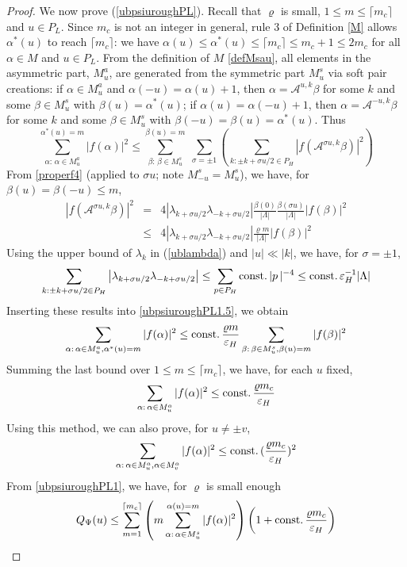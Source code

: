 \documentclass[11pt]{article}
\numberwithin{equation}{section}
\newcommand{\beq}{\begin{equation}}
\newcommand{\eeq}{\end{equation}}
\newcommand{\beqa}{\begin{eqnarray}}
\newcommand{\eeqa}{\end{eqnarray}}
\newcommand\eps{\varepsilon}
\newcommand\const{{\rm const.\, }}
\newcommand\al{{\alpha}}
\newcommand\be{\beta}
\renewcommand\rho\varrho
\theoremstyle{definition}
\begin{document}
\begin{proof}
\par We now prove (\ref{ubpsiuroughPL}).  Recall that $\rho$ is small,  $1\leq m\leq \lceil m_c\rceil$ and $u\in P_L$.
Since $m_c$ is not an integer in general, rule 3 of Definition \ref{M} allows $\al^*(u)$ to reach $\lceil m_c\rceil$: we have $\al(u)\le\al^*(u)\leq \lceil m_c\rceil\le m_c+1\le 2m_c$ for all $\al\in M$ and $u\in P_L$.
{F}rom the definition of $M$ \eqref{defMsau},  all elements in the asymmetric part,  $M^a_u$, are generated from the symmetric part
$M^s_u$ via soft pair creations: if $\al\in M^a_u$ and $\al(-u)=\al(u)+1$, then $\al=\mathcal A^{u, k}\be$ for some $k$ and some $\be\in M^s_u$ with $\be(u)=\al^*(u)$; if $\al(u)=\al(-u)+1$, then $\al=\mathcal A^{-u, k}\be$ for some $k$ and some $\be\in M^s_u$ with $\be(-u)=\be(u)=\al^*(u)$. Thus
\beq\label{ubpsiuroughPL1.5}
\sum_{\al:\, \al\in M_u^a}^{\al^*(u)=m}|f(\al)|^2\leq\sum_{\be:\, \be\in M_u^s}^{\be(u)=m}\;\sum_{\sigma=\pm1}\left(\sum_{k: \pm k+\sigma u/2\in P_H}|f(\mathcal A^{\sigma u, k} \beta)|^2\right)
\eeq
{F}rom \eqref{properf4} (applied to $\sigma u$; note $M^s_{-u}=M^s_u$), we have,  for $\beta(u)=\beta(-u) \le m$,
\beqa\nonumber
|f(\mathcal A^{\sigma u, k} \beta)|^2&=&  {4} \left|\lambda_{k+\sigma u/2}\lambda_{-k+\sigma u/2}\right|\frac{\be(0)}{|\Lambda|}\frac{\be(\sigma u)}{|\Lambda|}|f(\be)|^2\\\label{ubpsiuroughPL2}
&\leq&   {4} \left|\lambda_{k+\sigma u/2}\lambda_{-k+\sigma u/2}\right|\frac{\rho m}{|\Lambda|}|f(\be)|^2
\eeqa
Using the upper bound of $\lambda_k$ in (\ref{ublambda}) and  $|u|\ll |k|$, we have, for $\sigma=\pm1$,
\beq
\sum_{k:\pm k+\sigma u/2\in P_H}\left|\lambda_{k+\sigma u/2}\lambda_{-k+\sigma u/2}\right|\leq \sum_{p\in P_H}\const|p\,|^{-4}\leq \const\eps_H^{-1} |\Lambda|
\eeq
Inserting these results into \eqref{ubpsiuroughPL1.5}, we obtain 
\beq\label{ubpsiuroughPL1}
\sum_{\al:\, \al\in M_u^a, \al^*(u)=m}|f(\al)|^2\leq\const\frac{\rho m}{\eps_H} \sum_{\be:\, \be\in M_u^s,  \be(u)=m}|f(\be)|^2
\eeq
Summing the last bound over $1 \le m \le \lceil m_c\rceil$, we have,  for each $u$ fixed,
\beq\label{boundMa}
\sum_{\al:\, \al\in M_u^a}|f(\al)|^2\leq\const\frac{\rho m_c}{\eps_H}
\eeq
Using this method, we can also prove, for $u\neq \pm v$, 
\beq\label{boundMaMa}
\sum_{\al:\, \al\in M_u^a, \al\in M_v^a}|f(\al)|^2\leq\const(\frac{\rho m_c}{\eps_H})^2
\eeq
{F}rom \eqref{ubpsiuroughPL1}, we have, for  $\rho$ is small enough
\beq
 Q_\Psi(u)\leq \sum_{m=1}^{\lceil m_c\rceil} \left(m\sum_{\al:\,\al\in M^s_u}^{\al(u)=m}|f(\al)|^2\right)\left(1+\const\frac{\rho m_c}{\eps_H}\right)
\eeq


\end{proof}
\end{document}
